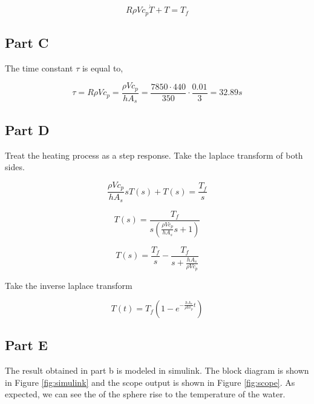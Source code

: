 \documentclass[12pt]{article}
\numberwithin{equation}{subsection}
\newcommand\ddfrac[2]{\frac{\displaystyle #1}{\displaystyle #2}}
\begin{document}
  \begin{equation}
    R\rho V c_p \dot T + T = T_f
  \end{equation}

  \subsection{Part C}

  The time constant $ \tau $ is equal to,

  \begin{equation}
    \tau = R\rho V c_p = \frac{\rho V c_p}{h A_s} = \frac{7850 \cdot 440}{350} \cdot \frac{0.01}{3} = 32.89s
  \end{equation}

  \subsection{Part D}

  Treat the heating process as a step response. Take the laplace transform of both sides.

  \begin{equation}
    \frac{\rho V c_p}{h A_s} s T(s) + T(s) = \frac{T_f}{s}
  \end{equation}

  \begin{equation}
    T(s) = \ddfrac{T_f}{s\left( \ddfrac{\rho V c_p}{hA_s}s + 1 \right)}
  \end{equation}

  \begin{equation}
    T(s) = \frac{T_f}{s} - \frac{T_f}{s + \frac{hA_s}{\rho V c_p}}
  \end{equation}

  Take the inverse laplace transform

  \begin{equation}
    T(t) = T_f \left( 1 - e^{-\ddfrac{hA_s}{\rho V c_p}t} \right)
  \end{equation}

  \subsection{Part E}

  The result obtained in part b is modeled in simulink. The block diagram is shown in Figure \ref{fig:simulink} and the scope output is shown in Figure \ref{fig:scope}. As expected, we can see the of the sphere rise to the temperature of the water.
\end{document}
